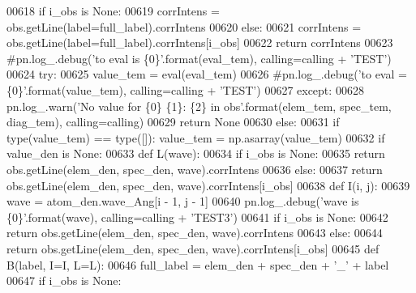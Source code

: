 \begin{DoxyCode}
{{{{{00618                 \textcolor{keywordflow}{if} i\_obs \textcolor{keywordflow}{is} \textcolor{keywordtype}{None}:
00619                     corrIntens = obs.getLine(label=full\_label).corrIntens
00620                 \textcolor{keywordflow}{else}:
00621                     corrIntens = obs.getLine(label=full\_label).corrIntens[i\_obs]
00622                 \textcolor{keywordflow}{return} corrIntens
00623             \textcolor{comment}{#pn.log\_.debug('to eval is \{0\}'.format(eval\_tem), calling=calling + 'TEST')}
00624             \textcolor{keywordflow}{try}:
00625                 value\_tem = eval(eval\_tem)
00626                 \textcolor{comment}{#pn.log\_.debug('to eval = \{0\}'.format(value\_tem), calling=calling + 'TEST')}
00627             \textcolor{keywordflow}{except}:
00628                 pn.log\_.warn(\textcolor{stringliteral}{'No value for \{0\} \{1\}: \{2\} in obs'}.format(elem\_tem, spec\_tem, diag\_tem), 
      calling=calling)
00629                 \textcolor{keywordflow}{return} \textcolor{keywordtype}{None}
00630         \textcolor{keywordflow}{else}:
00631             \textcolor{keywordflow}{if} type(value\_tem) == type([]): value\_tem = np.asarray(value\_tem)
00632         \textcolor{keywordflow}{if} value\_den \textcolor{keywordflow}{is} \textcolor{keywordtype}{None}:
00633             \textcolor{keyword}{def }L(wave): 
00634                 \textcolor{keywordflow}{if} i\_obs \textcolor{keywordflow}{is} \textcolor{keywordtype}{None}:
00635                     \textcolor{keywordflow}{return} obs.getLine(elem\_den, spec\_den, wave).corrIntens
00636                 \textcolor{keywordflow}{else}:
00637                     \textcolor{keywordflow}{return} obs.getLine(elem\_den, spec\_den, wave).corrIntens[i\_obs]
00638             \textcolor{keyword}{def }I(i, j):
00639                 wave = atom\_den.wave\_Ang[i - 1, j - 1]
00640                 pn.log\_.debug(\textcolor{stringliteral}{'wave is \{0\}'}.format(wave), calling=calling + \textcolor{stringliteral}{'TEST3'})
00641                 \textcolor{keywordflow}{if} i\_obs \textcolor{keywordflow}{is} \textcolor{keywordtype}{None}:
00642                     \textcolor{keywordflow}{return} obs.getLine(elem\_den, spec\_den, wave).corrIntens
00643                 \textcolor{keywordflow}{else}:
00644                     \textcolor{keywordflow}{return} obs.getLine(elem\_den, spec\_den, wave).corrIntens[i\_obs]
00645             \textcolor{keyword}{def }B(label, I=I, L=L):
00646                 full\_label = elem\_den + spec\_den + \textcolor{stringliteral}{'\_'} + label
00647                 \textcolor{keywordflow}{if} i\_obs \textcolor{keywordflow}{is} \textcolor{keywordtype}{None}:
}}}}}
\end{DoxyCode}
